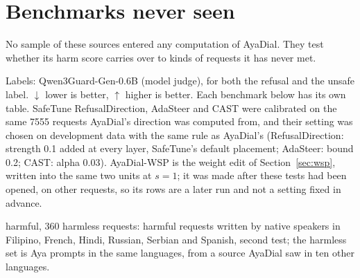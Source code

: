 \documentclass[10pt,a4paper]{article}
\begin{document}
\section{Benchmarks never seen}\label{sec:t2}
No sample of these sources entered any computation of AyaDial. They test whether its harm score carries over to kinds of requests it has never met.

Labels: Qwen3Guard-Gen-0.6B (model judge), for both the refusal and the unsafe label. $\downarrow$ lower is better, $\uparrow$ higher is better. Each benchmark below has its own table. SafeTune RefusalDirection, AdaSteer and CAST were calibrated on the same 7555 requests AyaDial's direction was computed from, and their setting was chosen on development data with the same rule as AyaDial's (RefusalDirection: strength 0.1 added at every layer, SafeTune's default placement; AdaSteer: bound 0.2; CAST: alpha 0.03). AyaDial-WSP is the weight edit of Section~\ref{sec:wsp}, written into the same two units at $s = 1$; it was made after these tests had been opened, on other requests, so its rows are a later run and not a setting fixed in advance.

\vspace{-3pt} harmful, 360 harmless requests: harmful requests written by native speakers in Filipino, French, Hindi, Russian, Serbian and Spanish, second test; the harmless set is Aya prompts in the same languages, from a source AyaDial saw in ten other languages.
\end{document}
